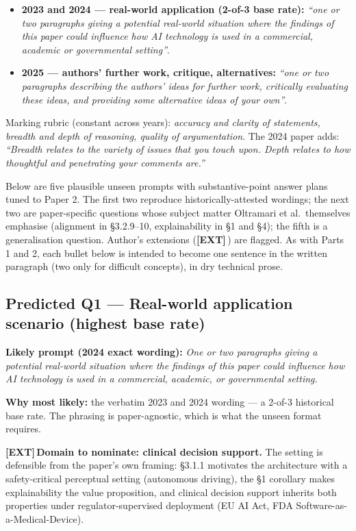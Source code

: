 \documentclass[11pt, a4paper]{article}
\newcommand{\extflag}{\textcolor{trapBd}{\textbf{[EXT]}}\,}
\begin{document}
\begin{itemize}
  \item \textbf{2023 and 2024 — real-world application (2-of-3 base rate):} \emph{``one or two paragraphs giving a potential real-world situation where the findings of this paper could influence how AI technology is used in a commercial, academic or governmental setting''}.
  \item \textbf{2025 — authors' further work, critique, alternatives:} \emph{``one or two paragraphs describing the authors' ideas for further work, critically evaluating these ideas, and providing some alternative ideas of your own''}.
\end{itemize}

Marking rubric (constant across years): \emph{accuracy and clarity of statements, breadth and depth of reasoning, quality of argumentation}. The 2024 paper adds: \emph{``Breadth relates to the variety of issues that you touch upon. Depth relates to how thoughtful and penetrating your comments are.''}

Below are five plausible unseen prompts with substantive-point answer plans tuned to Paper 2. The first two reproduce historically-attested wordings; the next two are paper-specific questions whose subject matter Oltramari et al.\ themselves emphasise (alignment in §3.2.9--10, explainability in §1 and §4); the fifth is a generalisation question. Author's extensions (\extflag{}) are flagged. As with Parts 1 and 2, each bullet below is intended to become one sentence in the written paragraph (two only for difficult concepts), in dry technical prose.

\subsection{Predicted Q1 — Real-world application scenario (highest base rate)}

\textbf{Likely prompt (2024 exact wording):} \emph{One or two paragraphs giving a potential real-world situation where the findings of this paper could influence how AI technology is used in a commercial, academic, or governmental setting.}

\textbf{Why most likely:} the verbatim 2023 and 2024 wording — a 2-of-3 historical base rate. The phrasing is paper-agnostic, which is what the unseen format requires.

\extflag{}\textbf{Domain to nominate: clinical decision support.} The setting is defensible from the paper's own framing: §3.1.1 motivates the architecture with a safety-critical perceptual setting (autonomous driving), the §1 corollary makes explainability the value proposition, and clinical decision support inherits both properties under regulator-supervised deployment (EU AI Act, FDA Software-as-a-Medical-Device).
\end{document}

